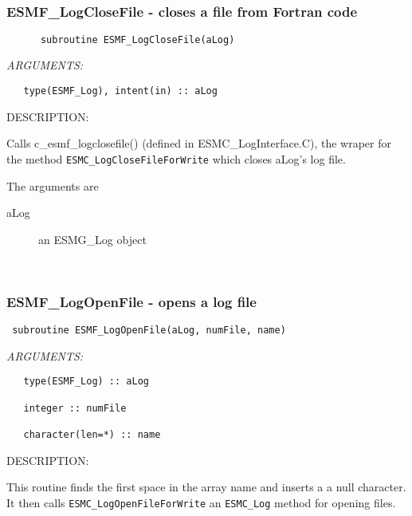 \mbox{}\hrulefill\ 
 
\subsubsection [ESMF\_LogCloseFile] {ESMF\_LogCloseFile - closes a file from Fortran code}


  
\begin{verbatim}      subroutine ESMF_LogCloseFile(aLog)\end{verbatim}{\em ARGUMENTS:}
\begin{verbatim}   type(ESMF_Log), intent(in) :: aLog\end{verbatim}
{\sf DESCRIPTION:\\ }


   Calls c\_esmf\_logclosefile() (defined in ESMC\_LogInterface.C), the wraper for the method {\tt ESMC\_LogCloseFileForWrite} which closes aLog's 
   log file.
  
   The arguments are
   \begin{description}
   \item[aLog]
    an ESMG\_Log object
  
    \end{description}
   
 
\mbox{}\hrulefill\ 
 

  \subsubsection [ESMF\_LogOpenFile] {ESMF\_LogOpenFile - opens a log file}


\begin{verbatim} subroutine ESMF_LogOpenFile(aLog, numFile, name)\end{verbatim}{\em ARGUMENTS:}
\begin{verbatim}   type(ESMF_Log) :: aLog
 
   integer :: numFile                              
 
   character(len=*) :: name
 \end{verbatim}
{\sf DESCRIPTION:\\ }


   This routine finds the first space in the array name and inserts a
   a null character. It then calls {\tt ESMC\_LogOpenFileForWrite} 
   an {\tt ESMC\_Log} method for opening files.
  
